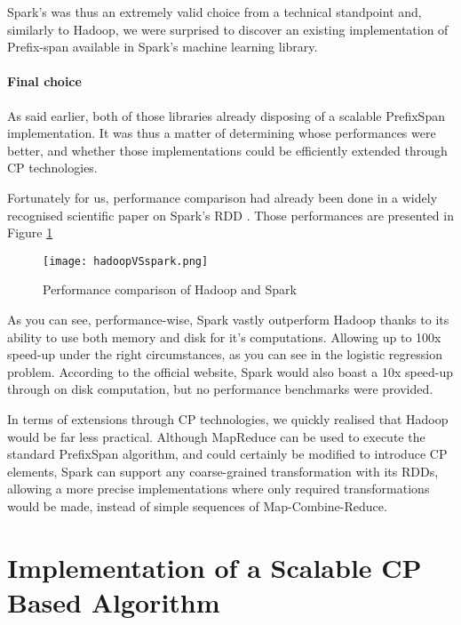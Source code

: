 \documentclass{eplmastersthesis}
\begin{document}
Spark's was thus an extremely valid choice from a technical standpoint and, similarly to Hadoop, we were surprised to discover an existing implementation of Prefix-span available in Spark's machine learning library.

\paragraph{Final choice}

As said earlier, both of those libraries already disposing of a scalable PrefixSpan implementation. It was thus a matter of determining whose performances were better, and whether those implementations could be efficiently extended through CP technologies. \newline

Fortunately for us, performance comparison had already been done in a widely recognised scientific paper on Spark's RDD \cite{RDD}. Those performances are presented in Figure \ref{fig:hadoopVSspark}

\begin{figure}[h]
  \centering
  \texttt{[image: hadoopVSspark.png]}
  \caption{Performance comparison of Hadoop and Spark}
  \label{fig:hadoopVSspark}
\end{figure}

As you can see, performance-wise, Spark vastly outperform Hadoop thanks to its ability to use both memory and disk for it's computations. Allowing up to 100x speed-up under the right circumstances, as you can see in the logistic regression problem. According to the official website, Spark would also boast a 10x speed-up through on disk computation, but no performance benchmarks were provided. \newline

In terms of extensions through CP technologies, we quickly realised that Hadoop would be far less practical. Although MapReduce can be used to execute the standard PrefixSpan algorithm, and could certainly be modified to introduce CP elements, Spark can support any coarse-grained transformation with its RDDs, allowing a more precise implementations where only required transformations would be made, instead of simple sequences of Map-Combine-Reduce. \newline

\section{Implementation of a Scalable CP Based Algorithm}
\end{document}
